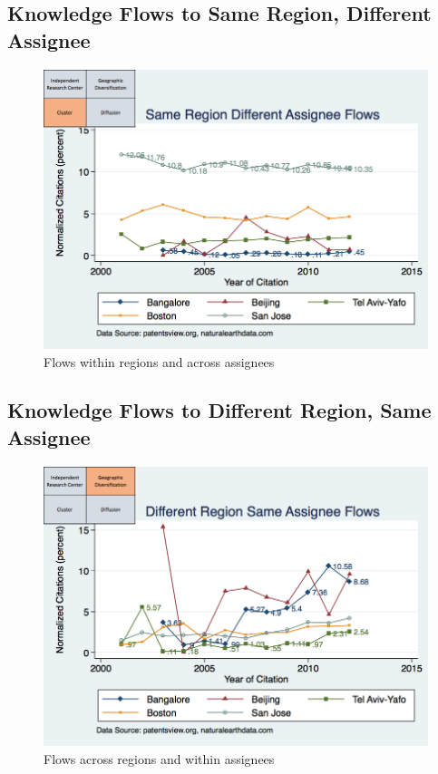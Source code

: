 \documentclass[12pt]{article}
\begin{document}
\subsection{Knowledge Flows to Same Region, Different Assignee}
\begin{figure}[h]
\begin{centering}
  \includegraphics[width=\textwidth]{SMSSameRegionDiffAssigneeFlows}
  \caption{Flows within regions and across assignees}
  \label{fig:SMSSameRegionDiffAssigneeFlows}
\end{centering}
\end{figure}

\subsection{Knowledge Flows to Different Region, Same Assignee}

\begin{figure}[h]
\begin{centering}
  \includegraphics[width=\textwidth]{SMSDiffRegionSameAssigneeFlows}
  \caption{Flows across regions and within assignees}
  \label{fig:SMSDiffRegionSameAssigneeFlows}
\end{centering}
\end{figure}
\end{document}
